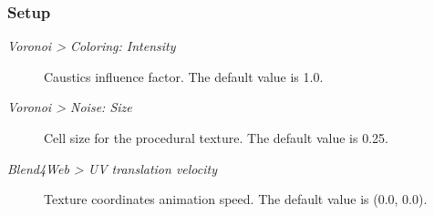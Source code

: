 \documentclass[a4paper,12pt,oneside]{sphinxmanual}
\begin{document}
\subsubsection{Setup}
\label{outdoor_rendering:id16}\begin{figure}[htbp]
\centering

\end{figure}
\begin{description}
\item[{\emph{Voronoi \textgreater{} Coloring: Intensity}}] \leavevmode
Caustics influence factor. The default value is 1.0.

\item[{\emph{Voronoi \textgreater{} Noise: Size}}] \leavevmode
Cell size for the procedural texture. The default value is 0.25.

\item[{\emph{Blend4Web \textgreater{} UV translation velocity}}] \leavevmode
Texture coordinates animation speed. The default value is (0.0, 0.0).

\end{description}
\end{document}
